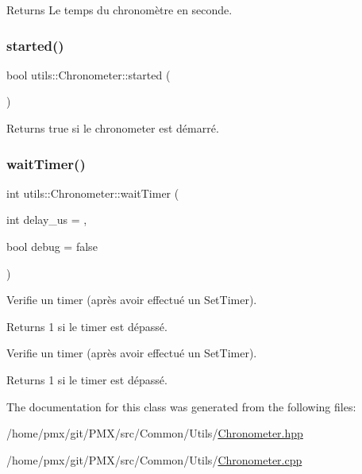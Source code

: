 \begin{DoxyReturn}{Returns}
Le temps du chronomètre en seconde. 
\end{DoxyReturn}
\mbox{\label{classutils_1_1Chronometer_af09b58a8ae28db72b09bca32efa3f95b}} 
\subsubsection{\texorpdfstring{started()}{started()}}
{\footnotesize\ttfamily bool utils\+::\+Chronometer\+::started (\begin{DoxyParamCaption}{ }\end{DoxyParamCaption})\hspace{0.3cm}{\ttfamily [inline]}}

\begin{DoxyReturn}{Returns}
{\ttfamily true} si le chronometer est démarré. 
\end{DoxyReturn}
\mbox{\label{classutils_1_1Chronometer_a821bfe0e70f7b50199557667c08dbb67}} 
\subsubsection{\texorpdfstring{wait\+Timer()}{waitTimer()}}
{\footnotesize\ttfamily int utils\+::\+Chronometer\+::wait\+Timer (\begin{DoxyParamCaption}\item[{int}]{delay\+\_\+us = {},  }\item[{bool}]{debug = {\ttfamily false} }\end{DoxyParamCaption})}



Verifie un timer (après avoir effectué un Set\+Timer). 

\begin{DoxyReturn}{Returns}
1 si le timer est dépassé.
\end{DoxyReturn}
Verifie un timer (après avoir effectué un Set\+Timer). \begin{DoxyReturn}{Returns}
1 si le timer est dépassé. 
\end{DoxyReturn}


The documentation for this class was generated from the following files\+:\begin{DoxyCompactItemize}
\item 
/home/pmx/git/\+P\+M\+X/src/\+Common/\+Utils/\hyperlink{Chronometer_8hpp}{Chronometer.\+hpp}\item 
/home/pmx/git/\+P\+M\+X/src/\+Common/\+Utils/\hyperlink{Chronometer_8cpp}{Chronometer.\+cpp}\end{DoxyCompactItemize}
